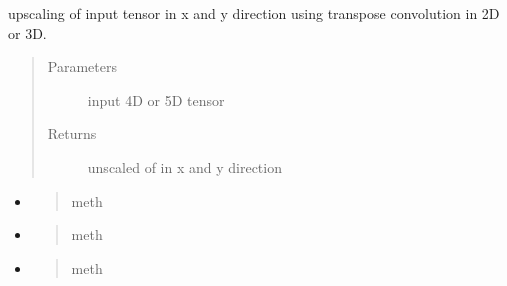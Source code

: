 \documentclass[letterpaper,10pt,english]{sphinxmanual}
\begin{document}
\begin{fulllineitems}
\label{\detokenize{index:unet.ops.up_conv}}
upscaling of input tensor in x and y direction using transpose convolution in 2D or 3D.
\begin{quote}\begin{description}
\item[{Parameters}] \leavevmode
{} \textendash{} input 4D or 5D tensor

\item[{Returns}] \leavevmode
unscaled of  in x and y direction

\end{description}\end{quote}



\begin{itemize}
\item {} \begin{quote}\begin{description}
\item[{meth}] \leavevmode
{}

\end{description}\end{quote}

\item {} \begin{quote}\begin{description}
\item[{meth}] \leavevmode
{}

\end{description}\end{quote}

\item {} \begin{quote}\begin{description}
\item[{meth}] \leavevmode
{}

\end{description}\end{quote}

\end{itemize}



\end{fulllineitems}
\end{document}
